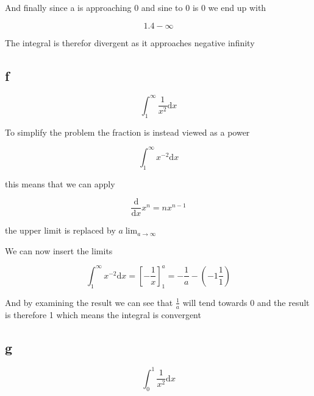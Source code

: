 \documentclass[12pt,a4paper]{article}
\begin{document}
And finally since a is approaching 0 and sine to 0 is 0 we end up with

\begin{equation} \label{}
1.4-\infty
\end{equation}

The integral is therefor divergent as it approaches negative infinity 



\subsection{f}


\begin{equation} \label{}
\int_{1}^{\infty}\frac{1}{x^2}\mathrm{d}x
\end{equation}

To simplify the problem the fraction is instead viewed as a power

\begin{equation} \label{}
\int_{1}^{\infty}x^{-2}\mathrm{d}x
\end{equation}

this means that we can apply

\begin{equation} \label{}
\frac{\mathrm{d}}{\mathrm{d}x}x^n=nx^{n-1}
\end{equation}

the upper limit is replaced by \begin{math}
a \lim_{a\to\infty} 
\end{math}

We can now insert the limits

\begin{equation} \label{}
\int_{1}^{\infty}x^{-2}\mathrm{d}x=\left[-\frac{1}{x}\right]_{1}^{a}=-\frac{1}{a}-(-1\frac{1}{1})
\end{equation}

And by examining the result we can see that \begin{math}
\frac{1}{a}
\end{math} will tend towards 0 and the result is therefore 1 which means the integral is convergent


\subsection{g}
\begin{equation} \label{}
\int_{0}^{1}\frac{1}{x^2}\mathrm{d}x
\end{equation}
\end{document}

